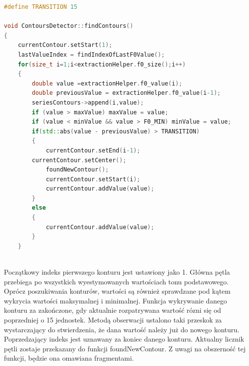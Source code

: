 \documentclass[a4paper,12 pt]{article}
\begin{document}
\begin{lstlisting}[caption={Początkowa faza funkcji wykrywającej kontury},label={lst:label},language=C++]
#define TRANSITION 15

void ContoursDetector::findContours()
{
    currentContour.setStart(1);
    lastValueIndex = findIndexOfLastF0Value();
    for(size_t i=1;i<extractionHelper.f0_size();i++)
    {
        double value =extractionHelper.f0_value(i);
        double previousValue = extractionHelper.f0_value(i-1); 
        seriesContours->append(i,value);
        if (value > maxValue) maxValue = value;
        if (value < minValue && value > F0_MIN) minValue = value;
        if(std::abs(value - previousValue) > TRANSITION)
        {
            currentContour.setEnd(i-1);
  	    currentContour.setCenter();    
            foundNewContour();
            currentContour.setStart(i);
            currentContour.addValue(value);
        }
        else
        {
            currentContour.addValue(value);
        }
    }
    
\end{lstlisting}
Początkowy indeks pierwszego konturu jest ustawiony jako 1. Główna pętla przebiega po wszystkich wyestymowanych wartościach tonu podstawowego. Oprócz poszukiwania konturów, wartości są również sprawdzane pod kątem wykrycia wartości maksymalnej i minimalnej. Funkcja wykrywanie danego konturu za zakończone, gdy aktualnie rozpatrywana wartość rózni się od poprzedniej o 15 jednostek. Metodą obserwacji ustalono taki przeskok za wystarczający do stwierdzenia, że dana wartość należy już do nowego konturu. Poprzedzający indeks jest uznawany za koniec danego konturu. Aktualny licznik pętli zostaje przekazany do funkcji foundNewContour. Z uwagi na obszerność tej funkcji, będzie ona omawiana fragmentami.
\end{document}
